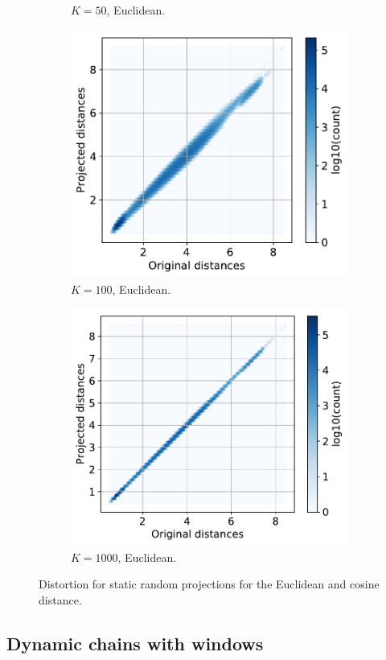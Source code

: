 \documentclass[11pt,onecolumn]{article}
\begin{document}
\begin{figure}[h!]
\begin{subfigure}[t]{0.29\textwidth}
				\caption{$K=50$, Euclidean.}
		\end{subfigure}
		\hfill
		\begin{subfigure}[t]{0.29\textwidth}
				\centering
				\includegraphics[width=\linewidth]{fig/sparse_projection_euclidean_k100.pdf}
				\caption{$K=100$, Euclidean.}
		\end{subfigure}
		\hfill
		\begin{subfigure}[t]{0.29\textwidth}
				\centering
				\includegraphics[width=\linewidth]{fig/sparse_projection_euclidean_k1000.pdf}
				\caption{$K=1000$, Euclidean.}
		\end{subfigure}
    \caption{Distortion for static random projections for the Euclidean and cosine distance.}
		\label{fig:distortion-static}
\end{figure}

\pagebreak

\subsection{Dynamic chains with windows}

\pagebreak





\printbibliography
\end{document}

